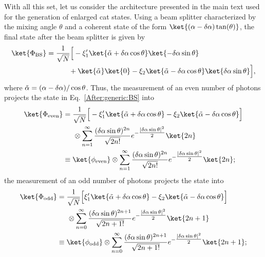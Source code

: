 With all this set, let us consider the architecture presented in the main text used for the generation of enlarged cat states. Using a beam splitter characterized by the mixing angle $\theta$ and a coherent state of the form $\ket{(\alpha - \delta \alpha) \tan(\theta)}$, the final state after the beam splitter is given by
\begin{equation}\label{After:generic:BS}
    \begin{aligned}
    \ket{\Phi_\text{BS}}
        &= \dfrac{1}{\sqrt{N}}
            \Big[
                 - \xi_1' \ket{\Tilde{\alpha} 
                    + \delta \alpha \cos\theta} \ket{-\delta \alpha \sin\theta}\\
                 &\hspace{1.1cm}
                 + \ket{\Tilde{\alpha}}\ket{0}
                 - \xi_2 \ket{\Tilde{\alpha} 
                 - \delta \alpha \cos\theta} \ket{\delta \alpha \sin\theta}
             \Big],
    \end{aligned}
\end{equation}
where $\Tilde{\alpha} = (\alpha-\delta\alpha)/\cos\theta$. Thus, the measurement of an even number of photons projects the state in Eq.~\eqref{After:generic:BS} into
\begin{equation}
    \begin{aligned}
    \ket{\Phi_\text{even}}
        &= \dfrac{1}{\sqrt{N}}
            \Big[
                 -\xi_1' \ket{\Tilde{\alpha}+\delta \alpha \cos\theta}
                 - \xi_2  \ket{\Tilde{\alpha}-\delta \alpha \cos\theta}
            \Big]\\
        &\hspace{0.5cm}
            \otimes
            \sum_{n=1}^\infty \dfrac{(\delta \alpha \sin\theta)^{2n}}{\sqrt{2n!}} e^{-\tfrac{|\delta \alpha \sin \theta|^2}{2}} \ket{2n}\\
        &\equiv \ket{\phi_\text{even}}
            \otimes
            \sum_{n=1}^\infty \dfrac{(\delta \alpha \sin\theta)^{2n}}{\sqrt{2n!}} e^{-\tfrac{|\delta \alpha \sin \theta|^2}{2}} \ket{2n};
    \end{aligned}
\end{equation}
the measurement of an odd number of photons projects the state into
\begin{equation}
    \begin{aligned}
    \ket{\Phi_\text{odd}}
        &= \dfrac{1}{\sqrt{N}}
            \Big[
                 \xi_1' \ket{\Tilde{\alpha}+\delta \alpha \cos\theta}
                 - \xi_2  \ket{\Tilde{\alpha}-\delta \alpha \cos\theta}
            \Big]\\
        &\hspace{0.5cm}
            \otimes
            \sum_{n=0}^\infty \dfrac{(\delta \alpha \sin\theta)^{2n+1}}{\sqrt{2n+1!}} e^{-\tfrac{|\delta \alpha \sin \theta|^2}{2}} \ket{2n+1}
            \\
        &\equiv \ket{\phi_\text{odd}}
            \otimes
            \sum_{n=0}^\infty \dfrac{(\delta \alpha \sin\theta)^{2n+1}}{\sqrt{2n+1!}} e^{-\tfrac{|\delta \alpha \sin \theta|^2}{2}} \ket{2n+1};
    \end{aligned}
\end{equation}

